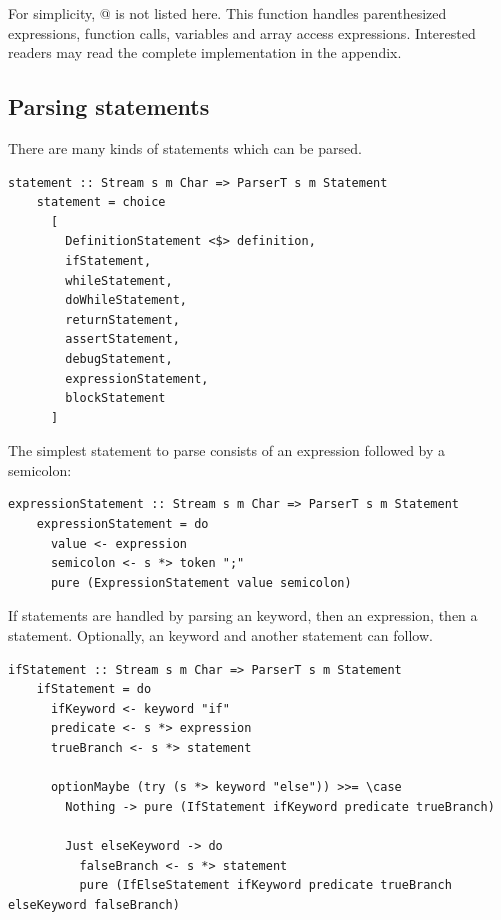 \documentclass[UdineBachThesis,american,11pt,draft]{PhdThesis}
\begin{document}
  For simplicity, @ is not listed here. This function
  handles parenthesized expressions, function calls, variables and array access
  expressions. Interested readers may read the complete implementation in the
  appendix.

  \subsection{Parsing statements}

  There are many kinds of statements which can be parsed.

  \begin{lstlisting}[gobble=4,basicstyle=\ttfamily\small]
    statement :: Stream s m Char => ParserT s m Statement
    statement = choice
      [
        DefinitionStatement <$> definition,
        ifStatement,
        whileStatement,
        doWhileStatement,
        returnStatement,
        assertStatement,
        debugStatement,
        expressionStatement,
        blockStatement
      ]
  \end{lstlisting}

  The simplest statement to parse consists of an expression followed by a
  semicolon:

  \begin{lstlisting}[gobble=4,basicstyle=\ttfamily\small]
    expressionStatement :: Stream s m Char => ParserT s m Statement
    expressionStatement = do
      value <- expression
      semicolon <- s *> token ";"
      pure (ExpressionStatement value semicolon)
  \end{lstlisting}

  If statements are handled by parsing an \lstinline@if@ keyword, then an
  expression, then a statement. Optionally, an \lstinline@else@ keyword and
  another statement can follow.

  \begin{lstlisting}[gobble=4,basicstyle=\ttfamily\small]
    ifStatement :: Stream s m Char => ParserT s m Statement
    ifStatement = do
      ifKeyword <- keyword "if"
      predicate <- s *> expression
      trueBranch <- s *> statement

      optionMaybe (try (s *> keyword "else")) >>= \case
        Nothing -> pure (IfStatement ifKeyword predicate trueBranch)

        Just elseKeyword -> do
          falseBranch <- s *> statement
          pure (IfElseStatement ifKeyword predicate trueBranch elseKeyword falseBranch)
  \end{lstlisting}
\end{document}
